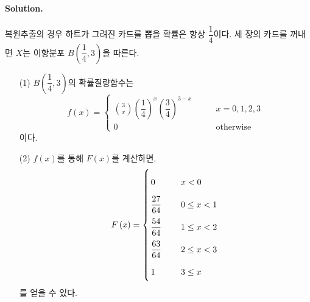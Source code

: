 \paragraph{Solution.} 복원추출의 경우 하트가 그려진 카드를 뽑을 확률은 항상 $\dfrac{1}{4}$이다. 세 장의 카드를 꺼내면 $X$는 이항분포 $B\left(\dfrac{1}{4}, 3\right)$을 따른다.
\begin{itemize}
  \item [(1)] $B\left(\dfrac{1}{4}, 3\right)$의 확률질량함수는 \[f\left(x\right) = \left\{
\begin{array}{ll}
	\displaystyle \binom{3}{x} \left(\dfrac{1}{4}\right)^x \left(\dfrac{3}{4}\right)^{3 - x} & \qquad x = 0, 1, 2, 3 \\
	0 & \qquad\textrm{otherwise}
\end{array}
\right. \] 이다.
  \item [(2)] $f\left(x\right)$를 통해 $F\left(x\right)$를 계산하면, \[
\arraycolsep=1.4pt\def\arraystretch{2.2}
F\left(x\right) = \left\{
\begin{array}{ll}
	0 & \qquad x < 0 \\
	\dfrac{27}{64} & \qquad 0 \leq x < 1 \\
	\dfrac{54}{64} & \qquad 1 \leq x < 2 \\
	\dfrac{63}{64} & \qquad 2 \leq x < 3 \\
	1 & \qquad 3 \leq x
\end{array}
\right.
\] 를 얻을 수 있다.
\end{itemize}
